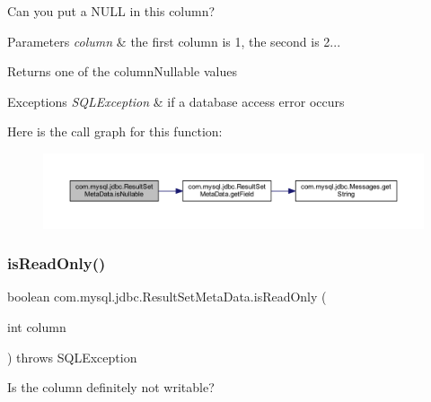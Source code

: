 Can you put a N\+U\+LL in this column?


\begin{DoxyParams}{Parameters}
{\em column} & the first column is 1, the second is 2...\\
\hline
\end{DoxyParams}
\begin{DoxyReturn}{Returns}
one of the column\+Nullable values
\end{DoxyReturn}

\begin{DoxyExceptions}{Exceptions}
{\em S\+Q\+L\+Exception} & if a database access error occurs \\
\hline
\end{DoxyExceptions}
Here is the call graph for this function\+:
\nopagebreak
\begin{figure}[H]
\begin{center}
\leavevmode
\includegraphics[width=350pt]{classcom_1_1mysql_1_1jdbc_1_1_result_set_meta_data_a40067f0bf2d16b2809974ebac6445d23_cgraph}
\end{center}
\end{figure}
\mbox{\label{classcom_1_1mysql_1_1jdbc_1_1_result_set_meta_data_aa55679657c2de6748866bdb7edae014d}} 
\subsubsection{\texorpdfstring{is\+Read\+Only()}{isReadOnly()}}
{\footnotesize\ttfamily boolean com.\+mysql.\+jdbc.\+Result\+Set\+Meta\+Data.\+is\+Read\+Only (\begin{DoxyParamCaption}\item[{int}]{column }\end{DoxyParamCaption}) throws S\+Q\+L\+Exception}

Is the column definitely not writable?


